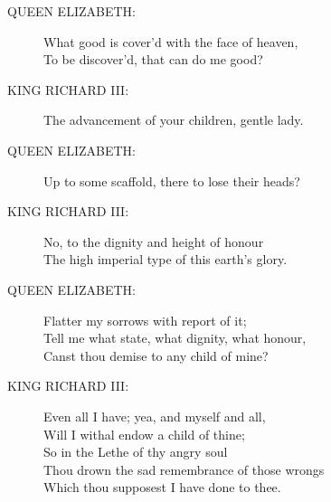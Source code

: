 \documentclass{article}
\begin{document}
\begin{description}
\item[QUEEN ELIZABETH:] 
\hspace{1pt}What good is cover'd with the face of heaven,\\
\hspace{1pt}To be discover'd, that can do me good?\\
\end{description}
\begin{description}
\item[KING RICHARD III:] 
\hspace{1pt}The advancement of your children, gentle lady.\\
\end{description}
\begin{description}
\item[QUEEN ELIZABETH:] 
\hspace{1pt}Up to some scaffold, there to lose their heads?\\
\end{description}
\begin{description}
\item[KING RICHARD III:] 
\hspace{1pt}No, to the dignity and height of honour\\
\hspace{1pt}The high imperial type of this earth's glory.\\
\end{description}
\begin{description}
\item[QUEEN ELIZABETH:] 
\hspace{1pt}Flatter my sorrows with report of it;\\
\hspace{1pt}Tell me what state, what dignity, what honour,\\
\hspace{1pt}Canst thou demise to any child of mine?\\
\end{description}
\begin{description}
\item[KING RICHARD III:] 
\hspace{1pt}Even all I have; yea, and myself and all,\\
\hspace{1pt}Will I withal endow a child of thine;\\
\hspace{1pt}So in the Lethe of thy angry soul\\
\hspace{1pt}Thou drown the sad remembrance of those wrongs\\
\hspace{1pt}Which thou supposest I have done to thee.\\
\end{description}
\end{document}
